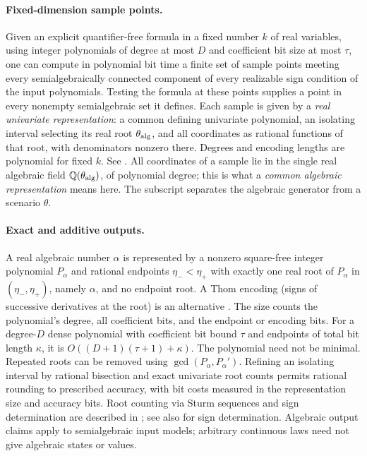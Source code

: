 \paragraph{Fixed-dimension sample points.}
\label{prim:a-pre-sample-points}
Given an explicit quantifier-free formula in a fixed number $k$ of real
variables, using integer polynomials of degree at most $D$ and coefficient
bit size at most $\tau$, one can compute in polynomial bit time a finite
set of sample points meeting every semialgebraically connected component
of every realizable sign condition of the input polynomials. Testing
the formula at these points supplies a point in every
nonempty semialgebraic set it defines. Each sample is given by a \emph{real
univariate representation}: a common defining univariate polynomial,
an isolating interval selecting its real root $\theta_{\rm alg}$, and
all coordinates as rational functions of that root, with denominators
nonzero there. Degrees and encoding lengths are polynomial for fixed
$k$. See \citet[Chapter 13, Sections 13.1 (finding realizable sign
conditions) and 13.3 (sample points), and Chapter 12, Section 12.4
(univariate representations)]{basu2006-algorithms-in-real-algebraic-geometry}.
All coordinates of a sample lie in the single real algebraic field
$\mathbb{Q}(\theta_{\rm alg})$, of polynomial degree; this is what a
\emph{common algebraic representation} means here. The subscript
separates the algebraic generator from a scenario $\theta$.

\paragraph{Exact and additive outputs.}
A real algebraic number $\alpha$ is represented by a nonzero square-free
integer polynomial $P_\alpha$ and rational endpoints $\eta_-<\eta_+$
with exactly one real root of $P_\alpha$ in $(\eta_-,\eta_+)$, namely
$\alpha$, and no endpoint root. A Thom encoding (signs of successive
derivatives at the root) is an alternative
\citep[Chapter 10]{basu2006-algorithms-in-real-algebraic-geometry}. The size counts the polynomial's degree, all coefficient
bits, and the endpoint or encoding bits. For a degree-$D$ dense
polynomial with coefficient bit bound $\tau$ and endpoints of total
bit length $\kappa$, it is $O((D+1)(\tau+1)+\kappa)$.
The polynomial need not be minimal. Repeated roots can be removed using
$\gcd(P_\alpha,P_\alpha')$. Refining an isolating interval by rational bisection and
exact univariate root counts permits rational rounding to prescribed
accuracy, with bit costs measured in the representation size and
accuracy bits. Root counting via Sturm sequences and sign determination
are described in
\citet[Chapters 2 and 10]{basu2006-algorithms-in-real-algebraic-geometry};
see also \citet[Section 2.5.1]{basu2014-algorithms-in-real-algebraic-geometry}
for sign determination.
Algebraic output claims apply to semialgebraic input models; arbitrary
continuous laws need not give algebraic states or values.

